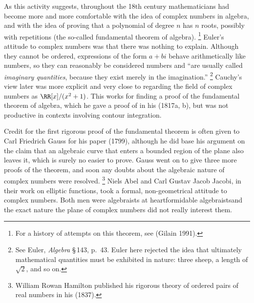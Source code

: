 As this activity suggests, throughout the 18th century mathematicians
had become more and more comfortable with the idea of complex numbers in
algebra, and with the idea of proving that a polynomial of degree $n$ has
$n$ roots, possibly with repetitions (the so-called fundamental theorem
of
%
algebra).%
%
\footnote{For a history of attempts on this theorem, see (Gilain 1991).} 
%
Euler's attitude to complex numbers was that there was
%
nothing to explain. Although they cannot be ordered, expressions of the
form $a+bi$  behave arithmetically like numbers, so they can reasonably be
%
considered numbers  and ``are usually called \emph{imaginary quantities},
because they exist merely in the imagination.''%
\footnote{See Euler,
\emph{Algebra} \S\,143, p.~43. Euler here rejected the idea that
ultimately mathematical quantities must be exhibited in nature: three
sheep, a length of $\sqrt{2}$, and so on.}
%
Cauchy's view later was more
explicit and very close to regarding  the field of complex numbers as
$\RR [x]/(x^2 + 1)$. This works for finding a proof of the fundamental
theorem of algebra, which he gave a proof of in his (1817a, b), but was
not productive in contexts involving contour integration.
%


Credit for the first rigorous proof of the fundamental theorem is often
given to Carl Friedrich Gauss
%
for his paper (1799), although he did
base his argument on the claim that an algebraic curve that enters a
bounded region of the plane also leaves it,  which is surely no easier
to prove.  Gauss went on to give three more proofs of the theorem,
and soon any doubts about the algebraic nature of complex numbers were
resolved.%
%
\footnote{William Rowan Hamilton
%
published his rigorous theory
of ordered pairs of real numbers in his (1837).}
%
Niels Abel
%
and Carl Gustav Jacob Jacobi,
%
 in their work  on elliptic functions, took a formal,
non-geometrical attitude to complex numbers.  Both men were algebraists
at heart\emdash formidable algebraists\emdash and the exact nature the
plane of complex numbers did not really interest them.

